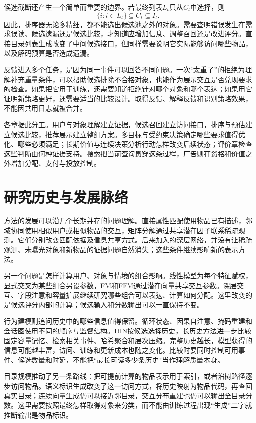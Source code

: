 候选截断还产生一个简单而重要的边界。若最终列表$L_t$只从$C_t$中选择，则
\begin{equation}
  \{i:i\in L_t\}\subseteq C_t\subseteq I_t.
  \label{eq:rs-candidate-containment}
\end{equation}
因此，排序器无论多精细，都不能选出候选池之外的对象。需要查明错误发生在需求误读、候选遗漏还是候选比较，才知道应增加信息、调整召回还是改进评分。直接目录列表生成改变了中间候选接口，但同样需要说明它实际能够访问哪些物品，以及解码预算是否造成遗漏。

反馈进入多个任务，是因为同一事件可以回答不同问题。一次“太重了”的拒绝为理解补充重量条件，可以帮助候选排除不合格对象，也能作为展示交互是否兑现要求的检查。如果把它用于训练，还需要知道拒绝针对哪个对象和哪个表达；如果用它证明新策略更好，还需要适当的比较设计。取得反馈、解释反馈和识别策略效果，不能因共用日志就被合并。

各章据此分工。用户与对象理解建立证据，候选召回建立访问接口，排序与预估建立候选比较，推荐展示建立整组方案。多目标与受约束决策确定哪些要求值得优化、哪些必须满足；长期价值与连续决策分析行动怎样改变后续状态；评价章检查这些判断由何种证据支持。搜索把当前查询贯穿这条过程，广告则在资格和价值之外增加分配、支付与投放控制。

\section{研究历史与发展脉络}
\label{sec:rs-development}

方法的发展可以沿几个长期并存的问题理解。直接属性匹配使用物品已有描述，邻域协同使用相似用户或相似物品的交互，矩阵分解通过共享潜在因子联系稀疏观测。它们分别改变匹配依据及信息共享方式。后来加入的深层网络，并没有让稀疏观测、未曝光对象和新物品的证据问题自然消失；这些条件继续影响新的表示方法。

另一个问题是怎样计算用户、对象与情境的组合影响。线性模型为每个特征赋权，显式交叉为某些组合另设参数，FM和FFM通过潜在向量共享交互参数。深层交互、字段注意和容量扩展继续研究哪些组合可以表达、计算如何分配。这里改变的是候选评分内部的计算；候选输入和分数输出可以一直保持不变。

行为建模则追问历史中的哪些信息值得保留。循环状态、因果自注意、掩码重建和会话图使用不同的顺序与监督结构。DIN按候选选择历史，长历史方法进一步比较固定容量记忆、检索相关事件、哈希聚合和层次压缩。完整历史越长，模型获得的信息可能越丰富，访问、训练和更新成本也随之变化。比较时要同时控制可用事件、候选数量和时延，不能把“最长可读多少条历史”当作理解质量本身。

目录规模推动了另一条路线：把可提前计算的物品表示用于索引，或者沿树路径逐步访问物品。语义标识生成改变了这一访问方式，将历史映射为物品代码，再查回真实目录；连续向量生成仍可以接近邻目录，交互分布重建也仍可以输出全目录分数。这里需要按照最终怎样取得对象来分类，而不能由训练过程出现“生成”二字就推断输出是物品标识。

